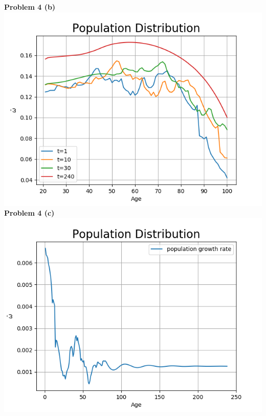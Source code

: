 \documentclass[letterpaper,12pt]{article}
\theoremstyle{definition}
\begin{document}
\noindent\textbf{Problem 4 (b)}\\
\includegraphics[scale=0.5]{images_dem/population_dist_times0.png}
\\

\noindent\textbf{Problem 4 (c)}\\
\includegraphics[scale=0.5]{images_dem/population_growth.png}
\\
\end{document}
